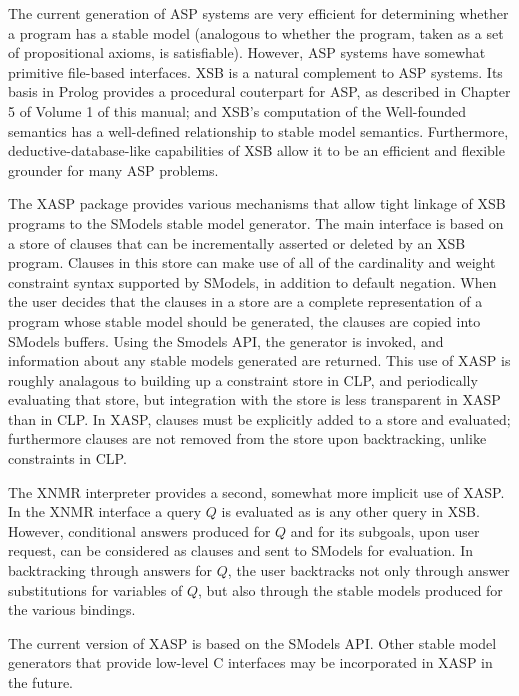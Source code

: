 The current generation of ASP systems are very efficient for
determining whether a program has a stable model (analogous to whether
the program, taken as a set of propositional axioms, is satisfiable).
However, ASP systems have somewhat primitive file-based interfaces.
XSB is a natural complement to ASP systems.  Its basis in Prolog
provides a procedural couterpart for ASP, as described in Chapter 5 of
Volume 1 of this manual; and XSB's computation of the Well-founded
semantics has a well-defined relationship to stable model semantics.
Furthermore, deductive-database-like capabilities of XSB allow it to
be an efficient and flexible grounder for many ASP problems.

The XASP package provides various mechanisms that allow tight linkage
of XSB programs to the SModels \cite{smodels:engine} stable model
generator.  The main interface is based on a store of clauses that can
be incrementally asserted or deleted by an XSB program.  Clauses in
this store can make use of all of the cardinality and weight
constraint syntax supported by SModels, in addition to default
negation.  When the user decides that the clauses in a store are a
complete representation of a program whose stable model should be
generated, the clauses are copied into SModels buffers.  Using the
Smodels API, the generator is invoked, and information about any
stable models generated are returned.  This use of XASP is roughly
analagous to building up a constraint store in CLP, and periodically
evaluating that store, but integration with the store is less
transparent in XASP than in CLP.  In XASP, clauses must be explicitly
added to a store and evaluated; furthermore clauses are not removed
from the store upon backtracking, unlike constraints in CLP.

The XNMR interpreter provides a second, somewhat more implicit use of
XASP.  In the XNMR interface a query $Q$ is evaluated as is any other
query in XSB.  However, conditional answers produced for $Q$ and for
its subgoals, upon user request, can be considered as clauses and sent
to SModels for evaluation.  In backtracking through answers for $Q$,
the user backtracks not only through answer substitutions for
variables of $Q$, but also through the stable models produced for the
various bindings. 

The current version of XASP is based on the SModels API.  Other stable
model generators that provide low-level C interfaces may be
incorporated in XASP in the future.


